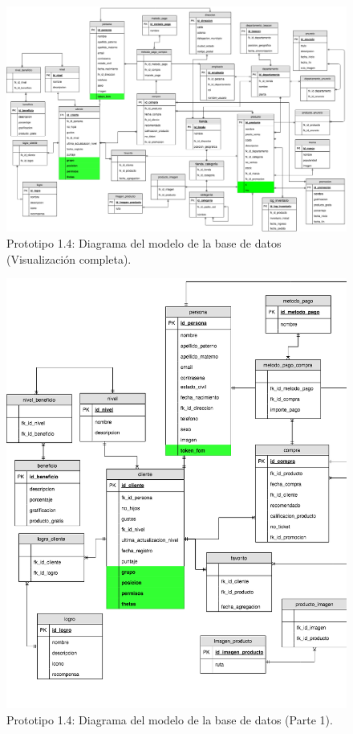 \label{Modelo-BD}
\FloatBarrier
\begin{figure}[htbp!]
		\centering
			\includegraphics[width=.9 \textwidth]{imagenes/modeloDatos/prototipo14/TT_Database_1}
		\caption{Prototipo 1.4: Diagrama del modelo de la base de datos (Visualización completa).}
		\label{image:prototipo14basededatos1}
\end{figure}
\FloatBarrier

\FloatBarrier
\begin{figure}[htbp!]
		\centering
			\includegraphics[width=.9 \textwidth]{imagenes/modeloDatos/prototipo14/TT_Database_2}
		\caption{Prototipo 1.4: Diagrama del modelo de la base de datos (Parte 1).}
		\label{image:prototipo14basededatos2}
\end{figure}
\FloatBarrier

